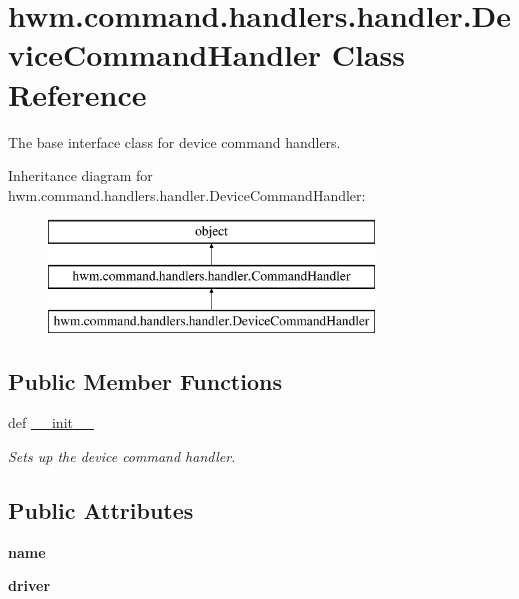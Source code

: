 \hypertarget{classhwm_1_1command_1_1handlers_1_1handler_1_1_device_command_handler}{\section{hwm.\-command.\-handlers.\-handler.\-Device\-Command\-Handler Class Reference}
\label{classhwm_1_1command_1_1handlers_1_1handler_1_1_device_command_handler}
}


The base interface class for device command handlers.  


Inheritance diagram for hwm.\-command.\-handlers.\-handler.\-Device\-Command\-Handler\-:\begin{figure}[H]
\begin{center}
\leavevmode
\includegraphics[height=3.000000cm]{classhwm_1_1command_1_1handlers_1_1handler_1_1_device_command_handler}
\end{center}
\end{figure}
\subsection*{Public Member Functions}
\begin{DoxyCompactItemize}
\item 
def \hyperlink{classhwm_1_1command_1_1handlers_1_1handler_1_1_device_command_handler_a55e2f7f3a39b6707049434eb629bf006}{\-\_\-\-\_\-init\-\_\-\-\_\-}
\begin{DoxyCompactList}\small\item\em Sets up the device command handler. \end{DoxyCompactList}\end{DoxyCompactItemize}
\subsection*{Public Attributes}
\begin{DoxyCompactItemize}
\item 
\hypertarget{classhwm_1_1command_1_1handlers_1_1handler_1_1_device_command_handler_a971d3014d8b79a6d29051660594be549}{{\bfseries name}}\label{classhwm_1_1command_1_1handlers_1_1handler_1_1_device_command_handler_a971d3014d8b79a6d29051660594be549}

\item 
\hypertarget{classhwm_1_1command_1_1handlers_1_1handler_1_1_device_command_handler_a6e7aca595a067f9bdb24bc82b6855074}{{\bfseries driver}}\label{classhwm_1_1command_1_1handlers_1_1handler_1_1_device_command_handler_a6e7aca595a067f9bdb24bc82b6855074}

\end{DoxyCompactItemize}


